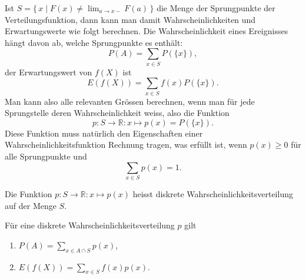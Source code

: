Ist $S=\{\,x\;|\;F(x)\ne \lim_{a\to x-}F(a)\,\}$ die Menge der Sprungpunkte 
der Verteilungsfunktion, dann kann man damit Wahrscheinlichkeiten und
Erwartungswerte wie folgt berechnen.
Die Wahrscheinlichkeit eines
Ereignisses hängt davon ab, welche Sprungpunkte es enthält:
\[
P(A)=\sum_{x\in S}P(\{x\}),
\]
der Erwartungswert von $f(X)$ ist
\[
E(f(X))=\sum_{x\in S}f(x)P(\{x\}).
\]
Man kann also alle relevanten Grössen berechnen, wenn man für jede
Sprungstelle deren Wahrscheinlichkeit weiss, also die Funktion
\[
p\colon S\to\mathbb{R}:x\mapsto p(x)=P(\{x\}).
\]
Diese Funktion muss natürlich den Eigenschaften einer
Wahrscheinlichkeitsfunktion Rechnung tragen, was erfüllt ist, wenn
$p(x)\ge 0$ für alle Sprungpunkte und 
\[
\sum_{x\in S}p(x)=1.
\]
\begin{definition}Die Funktion $p\colon S\to\mathbb{R}:x\mapsto p(x)$
heisst diskrete Wahrscheinlichkeitsverteilung auf der Menge $S$.
\end{definition}
\begin{satz}Für eine diskrete Wahrscheinlichkeitsverteilung $p$ gilt
\begin{enumerate}
\item $\displaystyle P(A)=\sum_{x\in A\cap S}p(x)$,
\item $\displaystyle E(f(X))=\sum_{x\in S}f(x)p(x)$.
\end{enumerate}
\end{satz}

